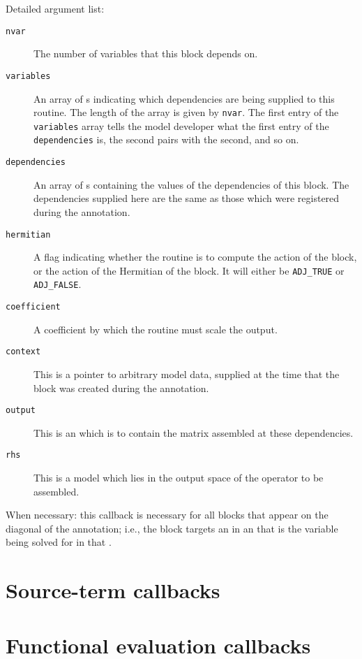\begin{framed}
Detailed argument list:
\begin{description}
\item[\texttt{nvar}] The number of variables that this block depends on.
\item[\texttt{variables}] An array of s indicating which dependencies are being supplied to this routine. The length of the
array is given by \texttt{nvar}. The first entry of the \texttt{variables} array
tells the model developer what the first entry of the \texttt{dependencies} is, the second pairs with the second, and so on.
\item[\texttt{dependencies}] An array of s containing the values of the dependencies of this block. The dependencies supplied
here are the same as those which were registered during the annotation.
\item[\texttt{hermitian}] A flag indicating whether the routine is to compute the action of the block, or the action of the Hermitian of the
block. It will either be \texttt{ADJ_TRUE} or \texttt{ADJ_FALSE}.
\item[\texttt{coefficient}] A coefficient by which the routine must scale the output.
\item[\texttt{context}] This is a pointer to arbitrary model data, supplied at the time that the block was created during the annotation.
\item[\texttt{output}] This is an  which is to contain the matrix assembled at these dependencies.
\item[\texttt{rhs}] This is a model  which lies in the output space of the operator to be assembled. 
\end{description}
\end{framed}

When necessary: this callback is necessary for all blocks that appear on the diagonal of the annotation; i.e., the block
targets an  in an  that is the variable being solved for in that
.

\section{Source-term callbacks}

\section{Functional evaluation callbacks}

